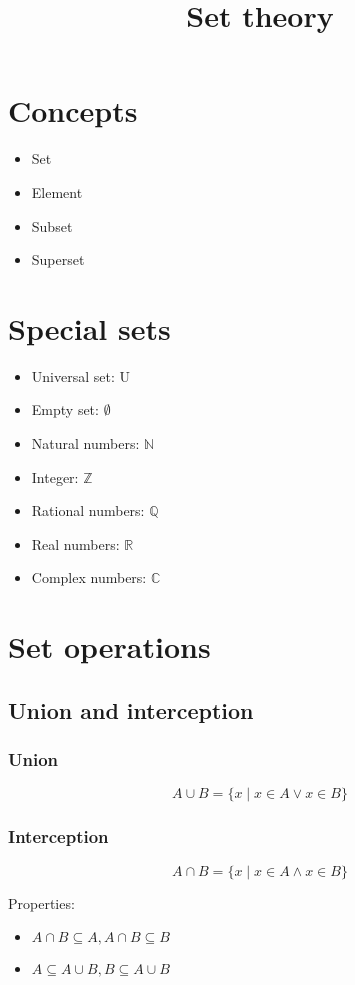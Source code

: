\documentclass{article}
\begin{document}
\title{Set theory}

\section{Concepts}

\begin{itemize}
  \item Set
  \item Element
  \item Subset
  \item Superset
\end{itemize}

\section{Special sets}

\begin{itemize}
  \item Universal set: U
  \item Empty set: $\emptyset$
  \item Natural numbers: $\mathbb{N}$
  \item Integer: $\mathbb{Z}$
  \item Rational numbers: $\mathbb{Q}$
  \item Real numbers: $\mathbb{R}$
  \item Complex numbers: $\mathbb{C}$
\end{itemize}

\section{Set operations}

\subsection{Union and interception}

\subsubsection{Union}
$$
A \cup B = \{ x \mid x \in A \lor x \in B \}
$$

\subsubsection{Interception}
$$
A \cap B = \{ x \mid x \in A \land x \in B \}
$$

Properties:
\begin{itemize}
  \item $A \cap B \subseteq A, A \cap B \subseteq B$
  \item $A \subseteq A \cup B, B \subseteq A \cup B$
\end{itemize}
\end{document}
